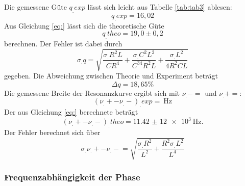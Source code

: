 \newpage
\noindent
Die gemessene Güte $q_.{exp}$ lässt sich leicht aus Tabelle \ref{tab:tab3} ablesen:
\[
q_.{exp}=16,02
\]
Aus Gleichung \eqref{eq:} lässt sich die theoretische Güte 
\[
q_.{theo}=19,0\pm 0,2
\] berechnen.
Der Fehler ist dabei durch 
\[
\sigma_.q=\sqrt{\frac{\sigma_.R^2L}{CR^4}+\frac{\sigma_.C^2L^2}{C^34R^2L}+\frac{\sigma_.L^2}{4R^2CL}}
\]
gegeben.
Die Abweichung zwischen Theorie und Experiment beträgt
\[
\Delta q = 18,65\%
\]
Die gemessene Breite der Resonanzkurve ergibt sich mit $\nu_.-=$ und $\nu_.+=$:
\[
(\nu_.+-\nu_.-)_.{exp}=\SI{}{\hertz}
\]
Der aus Gleichung \eqref{eq:} berechnete beträgt
\[
(\nu_.+-\nu_.-)_.{theo}=\SI{11,42(12)e3}{\hertz}\text{.}
\]
Der Fehler berechnet sich über
\[
\sigma_.{\nu_.+-\nu_.-}=\sqrt{\frac{\sigma_.R^2}{L^2}+\frac{R^2\sigma_.L^2}{L^4}}
\]
\subsubsection{Frequenzabhängigkeit der Phase}
